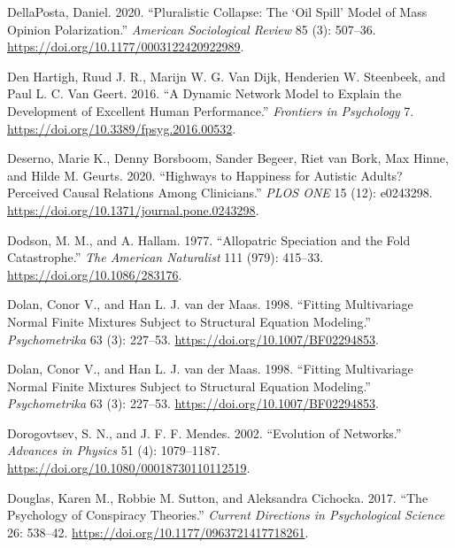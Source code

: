 \documentclass[
  letterpaper,
]{scrbook}
\newlength{\cslhangindent}
\newlength{\cslentryspacingunit} %
\newenvironment{CSLReferences}[2] %
 {%
  \setlength{\parindent}{0pt}
  \ifodd #1
  \let\oldpar\par
  \def\par{\hangindent=\cslhangindent\oldpar}
  \fi
  \setlength{\parskip}{#2\cslentryspacingunit}
 }%
 {}
\begin{document}
\begin{CSLReferences}{1}{0}
\leavevmode{}%
DellaPosta, Daniel. 2020. {``Pluralistic {Collapse}: {The} {`{Oil
Spill}'} {Model} of {Mass Opinion Polarization}.''} \emph{American
Sociological Review} 85 (3): 507--36.
\url{https://doi.org/10.1177/0003122420922989}.

\leavevmode{}%
Den Hartigh, Ruud J. R., Marijn W. G. Van Dijk, Henderien W. Steenbeek,
and Paul L. C. Van Geert. 2016. {``A {Dynamic Network Model} to
{Explain} the {Development} of {Excellent Human Performance}.''}
\emph{Frontiers in Psychology} 7.
\url{https://doi.org/10.3389/fpsyg.2016.00532}.

\leavevmode{}%
Deserno, Marie K., Denny Borsboom, Sander Begeer, Riet van Bork, Max
Hinne, and Hilde M. Geurts. 2020. {``Highways to Happiness for Autistic
Adults? {Perceived} Causal Relations Among Clinicians.''} \emph{PLOS
ONE} 15 (12): e0243298.
\url{https://doi.org/10.1371/journal.pone.0243298}.

\leavevmode{}%
Dodson, M. M., and A. Hallam. 1977. {``Allopatric {Speciation} and the
{Fold Catastrophe}.''} \emph{The American Naturalist} 111 (979):
415--33. \url{https://doi.org/10.1086/283176}.

\leavevmode{}%
Dolan, Conor V., and Han L. J. van der Maas. 1998. {``Fitting
Multivariage Normal Finite Mixtures Subject to Structural Equation
Modeling.''} \emph{Psychometrika} 63 (3): 227--53.
\url{https://doi.org/10.1007/BF02294853}.

\leavevmode{}%
Dolan, Conor V., and Han L. J. van der Maas. 1998. {``Fitting
Multivariage Normal Finite Mixtures Subject to Structural Equation
Modeling.''} \emph{Psychometrika} 63 (3): 227--53.
\url{https://doi.org/10.1007/BF02294853}.

\leavevmode{}%
Dorogovtsev, S. N., and J. F. F. Mendes. 2002. {``Evolution of
Networks.''} \emph{Advances in Physics} 51 (4): 1079--1187.
\url{https://doi.org/10.1080/00018730110112519}.

\leavevmode{}%
Douglas, Karen M., Robbie M. Sutton, and Aleksandra Cichocka. 2017.
{``The Psychology of Conspiracy Theories.''} \emph{Current Directions in
Psychological Science} 26: 538--42.
\url{https://doi.org/10.1177/0963721417718261}.


\end{CSLReferences}
\end{document}
